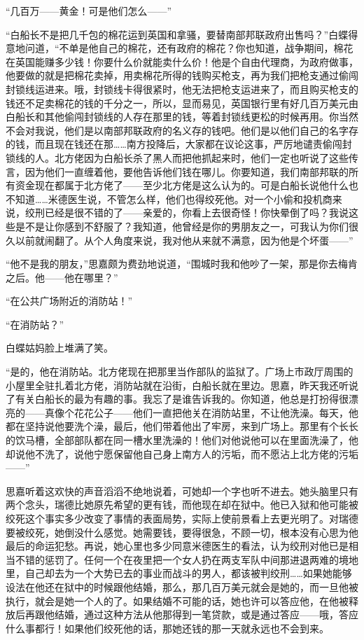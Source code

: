 \par “几百万——黄金！可是他们怎么——”
\par “白船长不是把几千包的棉花运到英国和拿骚，要替南部邦联政府出售吗？”白蝶得意地问道，“不单是他自己的棉花，还有政府的棉花？你也知道，战争期间，棉花在英国能赚多少钱！你要什么价就能卖什么价！他是个自由代理商，为政府做事，他要做的就是把棉花卖掉，用卖棉花所得的钱购买枪支，再为我们把枪支通过偷闯封锁线运进来。哦，封锁线卡得很紧时，他无法把枪支运进来了，而且购买枪支的钱还不足卖棉花的钱的千分之一，所以，显而易见，英国银行里有好几百万美元由白船长和其他偷闯封锁线的人存在那里的钱，等着封锁线更松的时候再用。你当然不会对我说，他们是以南部邦联政府的名义存的钱吧。他们是以他们自己的名字存的钱，而且现在钱还在那……南方投降后，大家都在议论这事，严厉地谴责偷闯封锁线的人。北方佬因为白船长杀了黑人而把他抓起来时，他们一定也听说了这些传言，因为他们一直缠着他，要他告诉他们钱在哪儿。你要知道，我们南部邦联的所有资金现在都属于北方佬了——至少北方佬是这么认为的。可是白船长说他什么也不知道……米德医生说，不管怎么样，他们也得绞死他。对一个小偷和投机商来说，绞刑已经是很不错的了——亲爱的，你看上去很奇怪！你快晕倒了吗？我说这些是不是让你感到不舒服了？我知道，他曾经是你的男朋友之一，可我认为你们很久以前就闹翻了。从个人角度来说，我对他从来就不满意，因为他是个坏蛋——”
\par “他不是我的朋友，”思嘉颇为费劲地说道，“围城时我和他吵了一架，那是你去梅肯之后。他——他在哪里？”
\par “在公共广场附近的消防站！”
\par “在消防站？”
\par 白蝶姑妈脸上堆满了笑。
\par “是的，他在消防站。北方佬现在把那里当作部队的监狱了。广场上市政厅周围的小屋里全驻扎着北方佬，消防站就在沿街，白船长就在里边。思嘉，昨天我还听说了有关白船长的最为有趣的事。我忘了是谁告诉我的。你知道，他总是打扮得很漂亮的——真像个花花公子——他们一直把他关在消防站里，不让他洗澡。每天，他都在坚持说他要洗个澡，最后，他们带着他出了牢房，来到广场上。那里有个长长的饮马槽，全部部队都在同一槽水里洗澡的！他们对他说他可以在里面洗澡了，他却说他不洗了，说他宁愿保留他自己身上南方人的污垢，而不愿沾上北方佬的污垢——”
\par 思嘉听着这欢快的声音滔滔不绝地说着，可她却一个字也听不进去。她头脑里只有两个念头，瑞德比她原先希望的更有钱，而他现在却在狱中。他已入狱和他可能被绞死这个事实多少改变了事情的表面局势，实际上使前景看上去更光明了。对瑞德要被绞死，她倒没什么感觉。她需要钱，要得很急，不顾一切，根本没有心思为他最后的命运犯愁。再说，她心里也多少同意米德医生的看法，认为绞刑对他已是相当不错的惩罚了。任何一个在夜里把一个女人扔在两支军队中间那进退两难的境地里，自己却去为一个大势已去的事业而战斗的男人，都该被判绞刑……如果她能够设法在他还在狱中的时候跟他结婚，那么，那几百万美元就会是她的，而一旦他被执行，就会是她一个人的了。如果结婚不可能的话，她也许可以答应他，在他被释放后再跟他结婚，通过这种方法从他那得到一笔贷款，或是通过答应——哦，答应什么事都行！如果他们绞死他的话，那她还钱的那一天就永远也不会到来。
